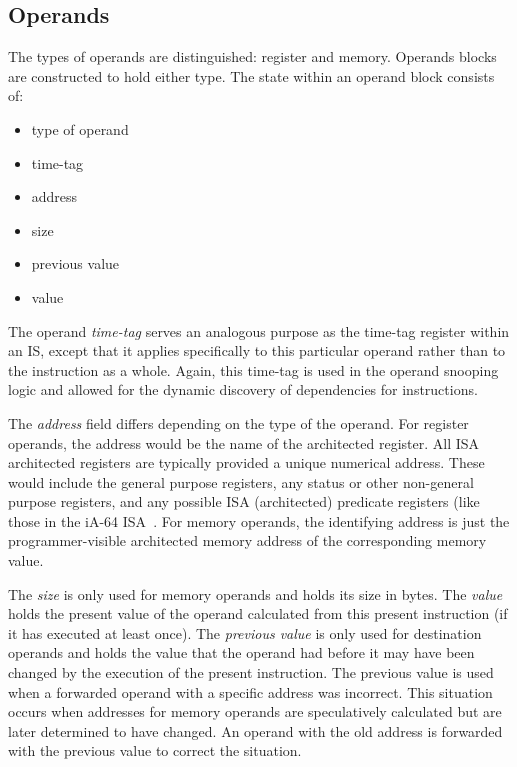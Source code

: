 \documentclass[10pt,dvips]{article}
\begin{document}
\subsection{Operands}
%
The types of operands are distinguished: register and memory.
Operands blocks are constructed to hold either type.
The state within an operand block consists of:
%
\begin{itemize}
\vspace{-0.10in}
\item{type of operand}
\vspace{-0.10in}
\item{time-tag}
\vspace{-0.10in}
\item{address}
\vspace{-0.10in}
\item{size}
\vspace{-0.10in}
\item{previous value}
\vspace{-0.10in}
\item{value}
\vspace{-0.10in}
\end{itemize}   
%
The operand \textit{time-tag}
serves
an analogous purpose as the time-tag register within an IS,
except that it applies specifically to this particular
operand rather than to the instruction as a whole.
Again, this time-tag is used in the operand snooping logic
and allowed for the dynamic discovery of dependencies
for instructions.

The \textit{address} field differs
depending on the type of the operand.
For register operands, the address would be
the name of the architected register.
All ISA architected registers are typically provided a
unique numerical address.  These would include the
general purpose registers, any status or other non-general
purpose registers, and any possible ISA (architected) predicate registers
(like those in the iA-64 ISA~\cite{intel99ia,schlansker00epic}.
For memory operands, the identifying address is just the
programmer-visible architected memory address of the corresponding
memory value.

The \textit{size} is only used for memory operands and holds
its size in bytes.
The \textit{value} holds the present value of the operand
calculated from this present instruction (if it has executed
at least once).
The \textit{previous value} is only used for destination
operands and holds the value that the operand
had before it may have been changed by the execution of 
the present instruction.
The previous value is used 
when a forwarded operand with a specific
address was incorrect.
This situation occurs when addresses for memory operands are
speculatively calculated but are later determined to have changed.
An operand with the old address is forwarded with the previous
value to correct the situation.
\end{document}
